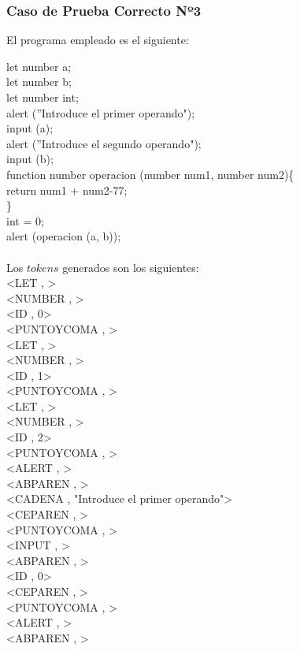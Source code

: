\documentclass{article}
\begin{document}
\subsubsection{Caso de Prueba Correcto Nº3}
\begin{center} 
El programa empleado es el siguiente:
\end{center}
\begin{flushleft}
let number a;\\
let number b;\\
let number int;\\
alert (''Introduce el primer operando");\\
input (a);\\
alert (''Introduce el segundo operando");\\
input (b);\\
function number operacion (number num1, number num2)\{\\
\qquad	return num1 + num2-77;\\
\}\\
int = 0;\\
alert (operacion (a, b));\\
\quad\\
Los $tokens$ generados son los siguientes:\\
<LET , >\\
<NUMBER , >\\
<ID , 0>\\
<PUNTOYCOMA , >\\
<LET , >\\
<NUMBER , >\\
<ID , 1>\\
<PUNTOYCOMA , >\\
<LET , >\\
<NUMBER , >\\
<ID , 2>\\
<PUNTOYCOMA , >\\
<ALERT , >\\
<ABPAREN , >\\
<CADENA , "Introduce el primer operando">\\
<CEPAREN , >\\
<PUNTOYCOMA , >\\
<INPUT , >\\
<ABPAREN , >\\
<ID , 0>\\
<CEPAREN , >\\
<PUNTOYCOMA , >\\
<ALERT , >\\
<ABPAREN , >\\

\end{flushleft}
\end{document}
